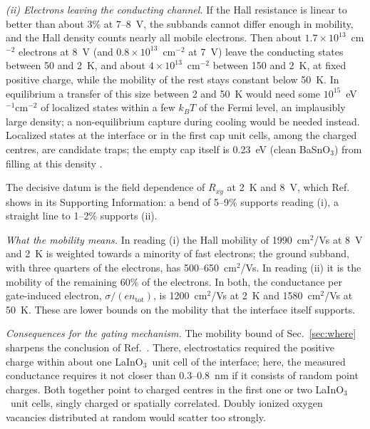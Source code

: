 \documentclass[11pt]{article}
\newcommand{\LIO}{\texorpdfstring{LaInO$_3$}{LaInO3}}
\newcommand{\BSO}{\texorpdfstring{BaSnO$_3$}{BaSnO3}}
\newcommand{\ntot}{n_\mathrm{tot}}
\begin{document}
\emph{(ii) Electrons leaving the conducting channel.} If the Hall resistance is linear to better than about 3\% at 7--8~V, the subbands cannot differ enough in mobility, and the Hall density counts nearly all mobile electrons. Then about $1.7\times10^{13}$~cm$^{-2}$ electrons at 8~V (and $0.8\times10^{13}$~cm$^{-2}$ at 7~V) leave the conducting states between 50 and 2~K, and about $4\times10^{13}$~cm$^{-2}$ between 150 and 2~K, at fixed positive charge, while the mobility of the rest stays constant below 50~K. In equilibrium a transfer of this size between 2 and 50~K would need some $10^{15}$~eV$^{-1}$cm$^{-2}$ of localized states within a few $k_BT$ of the Fermi level, an implausibly large density; a non-equilibrium capture during cooling would be needed instead. Localized states at the interface or in the first cap unit cells, among the charged centres, are candidate traps; the empty cap itself is 0.23~eV (clean \BSO) from filling at this density \cite{OwnbyMAT02}.

The decisive datum is the field dependence of $R_{xy}$ at 2~K and 8~V, which Ref.~\cite{Lee2024LIO} shows in its Supporting Information: a bend of 5--9\% supports reading (i), a straight line to 1--2\% supports (ii).

\emph{What the mobility means.} In reading (i) the Hall mobility of 1990~cm$^2$/Vs at 8~V and 2~K is weighted towards a minority of fast electrons; the ground subband, with three quarters of the electrons, has 500--650~cm$^2$/Vs. In reading (ii) it is the mobility of the remaining 60\% of the electrons. In both, the conductance per gate-induced electron, $\sigma/(e\ntot)$, is 1200~cm$^2$/Vs at 2~K and 1580~cm$^2$/Vs at 50~K. These are lower bounds on the mobility that the interface itself supports.

\emph{Consequences for the gating mechanism.} The mobility bound of Sec.~\ref{sec:where} sharpens the conclusion of Ref.~\cite{OwnbyMAT02}. There, electrostatics required the positive charge within about one \LIO\ unit cell of the interface; here, the measured conductance requires it not closer than 0.3--0.8~nm if it consists of random point charges. Both together point to charged centres in the first one or two \LIO\ unit cells, singly charged or spatially correlated. Doubly ionized oxygen vacancies distributed at random would scatter too strongly.
\end{document}
